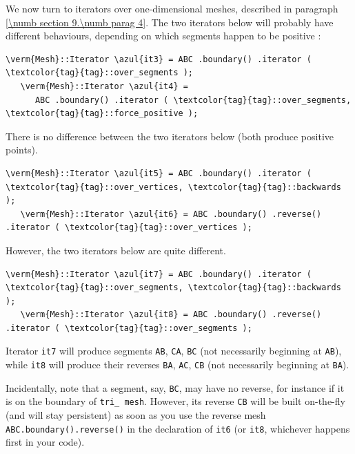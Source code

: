 We now turn to iterators over one-dimensional meshes, described in paragraph
\ref{\numb section 9.\numb parag 4}.
The two iterators below will probably have different behaviours,
depending on which segments happen to be positive :

\begin{Verbatim}[commandchars=\\\{\},formatcom=\small\tt,
   baselinestretch=0.94,framesep=2mm                      ]
   \verm{Mesh}::Iterator \azul{it3} = ABC .boundary() .iterator ( \textcolor{tag}{tag}::over_segments );
   \verm{Mesh}::Iterator \azul{it4} =
      ABC .boundary() .iterator ( \textcolor{tag}{tag}::over_segments, \textcolor{tag}{tag}::force_positive );
\end{Verbatim}

There is no difference between the two iterators below (both produce positive
points).

\begin{Verbatim}[commandchars=\\\{\},formatcom=\small\tt,
   baselinestretch=0.94,framesep=2mm                      ]
   \verm{Mesh}::Iterator \azul{it5} = ABC .boundary() .iterator ( \textcolor{tag}{tag}::over_vertices, \textcolor{tag}{tag}::backwards );
   \verm{Mesh}::Iterator \azul{it6} = ABC .boundary() .reverse() .iterator ( \textcolor{tag}{tag}::over_vertices );
\end{Verbatim}

However, the two iterators below are quite different.

\begin{Verbatim}[commandchars=\\\{\},formatcom=\small\tt,
   baselinestretch=0.94,framesep=2mm                      ]
   \verm{Mesh}::Iterator \azul{it7} = ABC .boundary() .iterator ( \textcolor{tag}{tag}::over_segments, \textcolor{tag}{tag}::backwards );
   \verm{Mesh}::Iterator \azul{it8} = ABC .boundary() .reverse() .iterator ( \textcolor{tag}{tag}::over_segments );
\end{Verbatim}

Iterator {\small\tt it7} will produce segments {\small\tt AB}, {\small\tt CA}, {\small\tt BC}
(not necessarily beginning at {\small\tt AB}), while {\small\tt it8} will produce their reverses
{\small\tt BA}, {\small\tt AC}, {\small\tt CB} (not necessarily beginning at {\small\tt BA}).

Incidentally, note that a segment, say, {\small\tt BC}, may have no reverse,
for instance if it is on the boundary of {\small\tt tri\_\,mesh}.
However, its reverse {\small\tt CB} will be built on-the-fly (and will stay persistent)
as soon as you use the reverse mesh {\small\tt ABC.boundary().reverse()} in the declaration of
{\small\tt it6} (or {\small\tt it8}, whichever happens first in your code).


